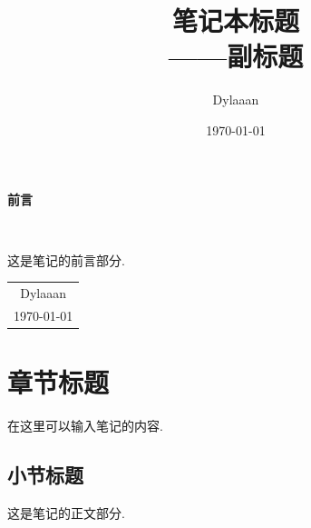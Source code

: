 \documentclass[12pt, a4paper, oneside]{ctexbook}
\title{{\Huge{\textbf{笔记本标题}}}\\——副标题}
\author{Dylaaan}
\date{\today}
\begin{document}
\maketitle

\setcounter{page}{1}

\begin{center}
    \Huge\textbf{前言}
\end{center}~\

这是笔记的前言部分. 
~\\
\begin{flushright}
    \begin{tabular}{c}
        Dylaaan\\
        \today
    \end{tabular}
\end{flushright}

\newpage
{}
\setcounter{page}{1}
\tableofcontents
\newpage
\setcounter{page}{1}

\chapter{章节标题}

在这里可以输入笔记的内容. 

\section{小节标题}

这是笔记的正文部分. 
\end{document}
